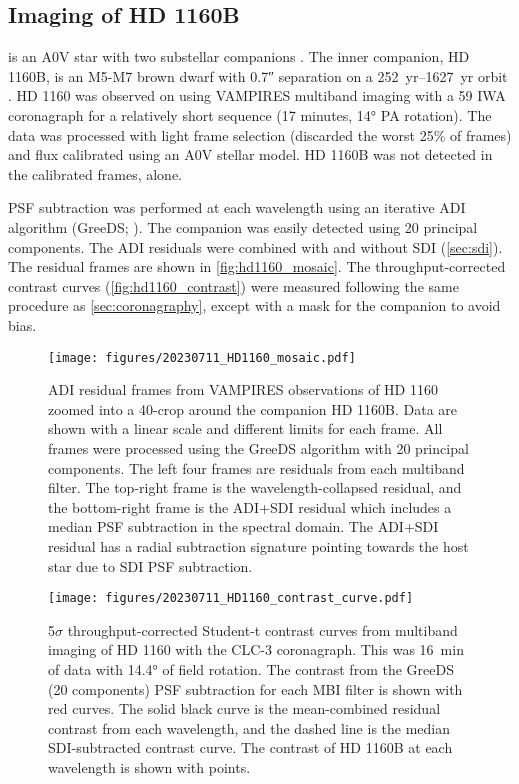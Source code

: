 
\subsection{Imaging of HD 1160B\label{sec:hd1160}}

 is an A0V star with two substellar companions \citep{nielsen_gemini_2012,maire_first_2016,garcia_scexao_2017,mesa_characterizing_2020}. The inner companion, HD 1160B, is an M5-M7 brown dwarf with \ang{;;0.7} separation on a \SIrange{252}{1627}{yr} orbit \citep{blunt_orbits_2017}. HD 1160 was observed on  using VAMPIRES multiband imaging with a \SI{59}{\mas} IWA coronagraph for a relatively short sequence (17 minutes, \ang{14} PA rotation). The data was processed with light frame selection (discarded the worst 25\% of frames) and flux calibrated using an A0V stellar model. HD 1160B was not detected in the calibrated frames, alone.

PSF subtraction was performed at each wavelength using an iterative ADI algorithm (GreeDS; \citealt{pairet_reference-less_2019,pairet_mayonnaise_2020,stapper_iterative_2022}). The companion was easily detected using 20 principal components. The ADI residuals were combined with and without SDI (\autoref{sec:sdi}). The residual frames are shown in \autoref{fig:hd1160_mosaic}. The throughput-corrected contrast curves (\autoref{fig:hd1160_contrast}) were measured following the same procedure as \autoref{sec:coronagraphy}, except with a mask for the companion to avoid bias.

\begin{figure*}[t]
    \centering
    \texttt{[image: figures/20230711\_HD1160\_mosaic.pdf]}
    \caption{ADI residual frames from VAMPIRES observations of HD 1160 zoomed into a \SI{40}{\pixel}-crop around the companion HD 1160B. Data are shown with a linear scale and different limits for each frame. All frames were processed using the GreeDS algorithm with 20 principal components. The left four frames are residuals from each multiband filter. The top-right frame is the wavelength-collapsed residual, and the bottom-right frame is the ADI+SDI residual which includes a median PSF subtraction in the spectral domain. The ADI+SDI residual has a radial subtraction signature pointing towards the host star due to SDI PSF subtraction.\label{fig:hd1160_mosaic}}
\end{figure*}

\begin{figure}[h]
    \centering
    \texttt{[image: figures/20230711\_HD1160\_contrast\_curve.pdf]}
    \caption{5$\sigma$ throughput-corrected Student-t contrast curves from multiband imaging of HD 1160 with the CLC-3 coronagraph. This was \SI{16}{\minute} of data with \ang{14.4} of field rotation. The contrast from the GreeDS (20 components) PSF subtraction for each MBI filter is shown with red curves. The solid black curve is the mean-combined residual contrast from each wavelength, and the dashed line is the median SDI-subtracted contrast curve. The contrast of HD 1160B at each wavelength is shown with points.\label{fig:hd1160_contrast}}
\end{figure}


